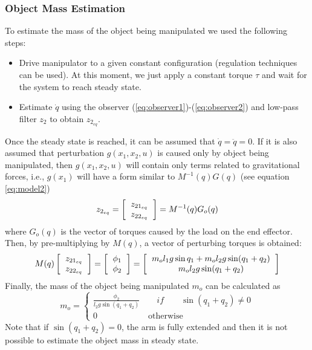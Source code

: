 \documentclass[9pt,spanish,aspectratio=1610]{beamer}
\begin{document}
\begin{frame}\frametitle{Object Mass Estimation}
  To estimate the mass of the object being manipulated we used the following steps:
  \begin{itemize}
  \item Drive manipulator to a given constant configuration (regulation techniques can be used). At this moment, we just apply a constant torque $\tau$ and wait for the system to reach steady state.
  \item Estimate $\dot{q}$ using the observer (\ref{eq:observer1})-(\ref{eq:observer2}) and low-pass filter $z_2$ to obtain $z_{2_{eq}}$.
  \end{itemize}
  Once the steady state is reached, it can be assumed that $\dot{q} = \ddot{q} = 0$. If it is also assumed that perturbation $g(x_1, x_2, u)$ is caused only by object being manipulated, then $g(x_1, x_2, u)$ will contain only terms related to gravitational forces, i.e., $g(x_1)$ will have a form similar to $M^{-1}(q)G(q)$ (see equation \ref{eq:model2})
  \[
    z_{2_{eq}} = \left[\begin{tabular}{c}
            $z_{21_{eq}}$\\
            $z_{22_{eq}}$
    \end{tabular}\right] = M^{-1}(q)G_o(q)
\]
where $G_o(q)$ is the vector of torques caused by the load on the end effector. Then, by pre-multiplying by $M(q)$, a vector of perturbing torques is obtained:
\begin{equation*}
  M(q)\left[\begin{tabular}{c}
            $z_{21_{eq}}$\\
            $z_{22_{eq}}$
   \end{tabular}\right] =
   \left[\begin{tabular}{c}
            $\phi_1$\\
            $\phi_2$
  \end{tabular}\right] =
  \left[\begin{tabular}{c}
            $m_o l_1 g \sin q_1 + m_o l_2 g\sin(q_1 + q_2)$\\
            $m_o l_2 g\sin(q_1 + q_2)$
    \end{tabular}\right]
\end{equation*}
Finally, the mass of the object being manipulated $m_o$ can be calculated as
\begin{equation}
  m_o = \begin{cases}
    \frac{\phi_2}{l_2 g \sin(q_1 + q_2)} \qquad if\qquad \sin(q_1 + q_2) \neq 0\\
    0 \qquad\qquad\qquad \textrm{otherwise}
    \end{cases}
  \end{equation}
  Note that if $\sin(q_1 +q_2) = 0$, the arm is fully extended and then it is not possible to estimate the object mass in steady state.
\end{frame}
\end{document}
